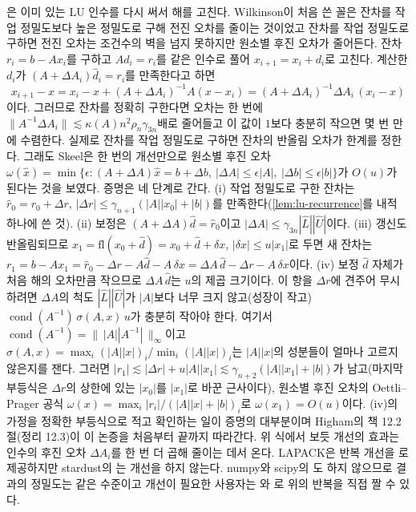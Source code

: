 은 이미 있는 LU 인수를 다시 써서 해를 고친다. Wilkinson이 처음 쓴 꼴은 잔차를 작업 정밀도보다 높은 정밀도로 구해 전진 오차를 줄이는 것이었고 잔차를 작업 정밀도로 구하면 전진 오차는 조건수의 벽을 넘지 못하지만 원소별 후진 오차가 줄어든다. 잔차 $r_i=b-Ax_i$를 구하고 $Ad_i=r_i$를 같은 인수로 풀어 $x_{i+1}=x_i+d_i$로 고친다. 계산한 $d_i$가 $(A+\Delta A_i)\hat d_i=r_i$를 만족한다고 하면
\[
x_{i+1}-x=x_i-x+(A+\Delta A_i)^{-1}A(x-x_i)=(A+\Delta A_i)^{-1}\Delta A_i\,(x_i-x)
\]
이다. 그러므로 잔차를 정확히 구한다면 오차는 한 번에 $\|A^{-1}\Delta A_i\|\lesssim\kappa(A)n^2\rho_n\gamma_{3n}$배로 줄어들고 이 값이 $1$보다 충분히 작으면 몇 번 만에 수렴한다. 실제로 잔차를 작업 정밀도로 구하면 잔차의 반올림 오차가 한계를 정한다. 그래도 Skeel은 한 번의 개선만으로 원소별 후진 오차 $\omega(\hat x)=\min\{\epsilon:(A+\Delta A)\hat x=b+\Delta b,\ |\Delta A|\le\epsilon|A|,\ |\Delta b|\le\epsilon|b|\}$가 $O(u)$가 된다는 것을 보였다\cite{skeel1980refinement}. 증명은 네 단계로 간다. (i) 작업 정밀도로 구한 잔차는 $\hat r_0=r_0+\Delta r$, $|\Delta r|\le\gamma_{n+1}(|A||x_0|+|b|)$를 만족한다(\cref{lem:lu-recurrence}를 내적 하나에 쓴 것). (ii) 보정은 $(A+\Delta A)\hat d=\hat r_0$이고 $|\Delta A|\le\gamma_{3n}|\hat L||\hat U|$이다. (iii) 갱신도 반올림되므로 $x_1=\mathrm{fl}(x_0+\hat d)=x_0+\hat d+\delta x$, $|\delta x|\le u|x_1|$로 두면 새 잔차는 $r_1=b-Ax_1=\hat r_0-\Delta r-A\hat d-A\,\delta x=\Delta A\,\hat d-\Delta r-A\,\delta x$이다. (iv) 보정 $\hat d$ 자체가 처음 해의 오차만큼 작으므로 $\Delta A\,\hat d$는 $u$의 제곱 크기이다. 이 항을 $\Delta r$에 견주어 무시하려면 $\Delta A$의 척도 $|\hat L||\hat U|$가 $|A|$보다 너무 크지 않고(성장이 작고) $\operatorname{cond}(A^{-1})\,\sigma(A,x)\,u$가 충분히 작아야 한다. 여기서 $\operatorname{cond}(A^{-1})=\|\,|A||A^{-1}|\,\|_\infty$이고 $\sigma(A,x)=\max_i(|A||x|)_i/\min_i(|A||x|)_i$는 $|A||x|$의 성분들이 얼마나 고르지 않은지를 잰다. 그러면 $|r_1|\lesssim|\Delta r|+u|A||x_1|\lesssim\gamma_{n+2}(|A||x_1|+|b|)$가 남고(마지막 부등식은 $\Delta r$의 상한에 있는 $|x_0|$를 $|x_1|$로 바꾼 근사이다), 원소별 후진 오차의 Oettli--Prager 공식 $\omega(x)=\max_i|r_i|/(|A||x|+|b|)_i$로 $\omega(x_1)=O(u)$이다. (iv)의 가정을 정확한 부등식으로 적고 확인하는 일이 증명의 대부분이며 Higham의 책 12.2절(정리 12.3)이 이 논증을 처음부터 끝까지 따라간다\cite{higham2002accuracy}. 위 식에서 보듯 개선의 효과는 인수의 후진 오차 $\Delta A_i$를 한 번 더 곱해 줄이는 데서 온다. LAPACK은 반복 개선을 로 제공하지만 stardust의 는 개선을 하지 않는다. numpy와 scipy의 도 하지 않으므로 결과의 정밀도는 같은 수준이고 개선이 필요한 사용자는 와 로 위의 반복을 직접 짤 수 있다.
